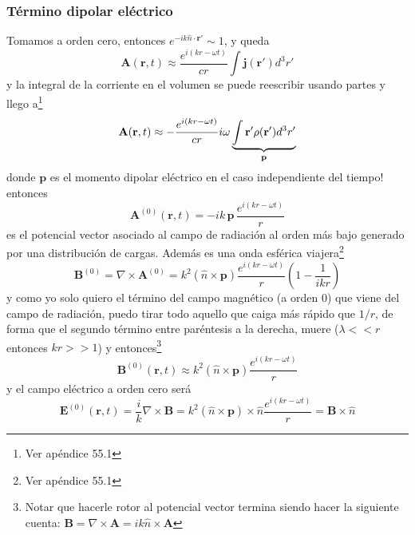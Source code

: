 \subsubsection{Término dipolar eléctrico}
Tomamos a orden cero, entonces $e^{-ik\hat{n}\cdot \textbf{r}'} \sim 1$, y queda
\begin{equation*}
    \textbf{A}(\textbf{r},t) \approx \frac{e^{i(kr - \omega t)}}{cr}
    \int \textbf{j}(\textbf{r}')d^{3}r'
\end{equation*}
y la integral de la corriente en el volumen se puede reescribir usando partes y llego a\footnote{Ver apéndice 55.1}
\begin{equation*}
    \textbf{A}(\textbf{r},t) \approx - 
    \frac{e^{i(kr -\omega t)}}{cr}i\omega 
    \underbrace{%
        \int \textbf{r}'\rho(\textbf{r}')d^{3}r'
        }_{\textbf{p}}
\end{equation*}
donde $\textbf{p}$ es el momento dipolar eléctrico en el caso independiente del tiempo! entonces 
\begin{equation}
    \textbf{A}^{(0)}(\textbf{r},t) = - i k\, \textbf{p}\,
    \frac{e^{i(kr - \omega t)}}{r}
        \label{ec:TerminoDipolarElectricoA}
\end{equation}
es el potencial vector asociado al campo de radiación al orden más bajo generado por una distribución de cargas. Además es una onda esférica viajera\footnote{Ver apéndice 55.1}
\begin{equation*}
    \textbf{B}^{(0)} 
    = \nabla \times \textbf{A}^{(0)} 
    = k^{2}(\hat{n} \times \textbf{p}) 
    \frac{e^{i(kr - \omega t)}}{r}
    \left(
        1 - \frac{1}{ikr}
    \right)
\end{equation*}
y como yo solo quiero el término del campo magnético (a orden $0$) que viene del campo de radiación, puedo tirar todo aquello que caiga más rápido que $1/r$, de forma que el segundo término entre paréntesis a la derecha, muere ($\lambda << r$ entonces $kr >> 1$) y entonces\footnote{Notar que hacerle rotor al potencial vector termina siendo hacer la siguiente cuenta: $\textbf{B} = \nabla \times \textbf{A} = ik\hat{n}\times \textbf{A}$}
\begin{equation}
    \textbf{B}^{(0)}(\textbf{r}, t) \approx
    k^{2} (\hat{n}\times \textbf{p})
    \frac{e^{i(kr - \omega t)}}{r}
        \label{ec:TerminoDipolarMagneticoB}
\end{equation}
y el campo eléctrico a orden cero será
\begin{equation*}
    \textbf{E}^{(0)}(\textbf{r},t)
    = \frac{i}{k}\nabla \times \textbf{B}
    = k^{2}(\hat{n}\times \textbf{p}) \times \hat{n}
    \frac{e^{i(kr - \omega t)}}{r}
    = \textbf{B} \times \hat{n}
\end{equation*}
